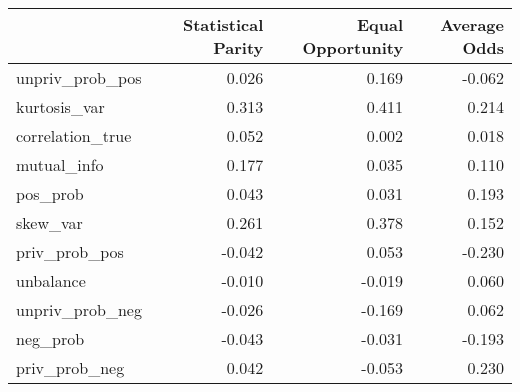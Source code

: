 \begin{tabular}{lrrr}
\toprule
 & Statistical Parity & Equal Opportunity & Average Odds \\
\midrule
unpriv_prob_pos & 0.026 & 0.169 & -0.062 \\
kurtosis_var & 0.313 & 0.411 & 0.214 \\
correlation_true & 0.052 & 0.002 & 0.018 \\
mutual_info & 0.177 & 0.035 & 0.110 \\
pos_prob & 0.043 & 0.031 & 0.193 \\
skew_var & 0.261 & 0.378 & 0.152 \\
priv_prob_pos & -0.042 & 0.053 & -0.230 \\
unbalance & -0.010 & -0.019 & 0.060 \\
unpriv_prob_neg & -0.026 & -0.169 & 0.062 \\
neg_prob & -0.043 & -0.031 & -0.193 \\
priv_prob_neg & 0.042 & -0.053 & 0.230 \\
\bottomrule
\end{tabular}
